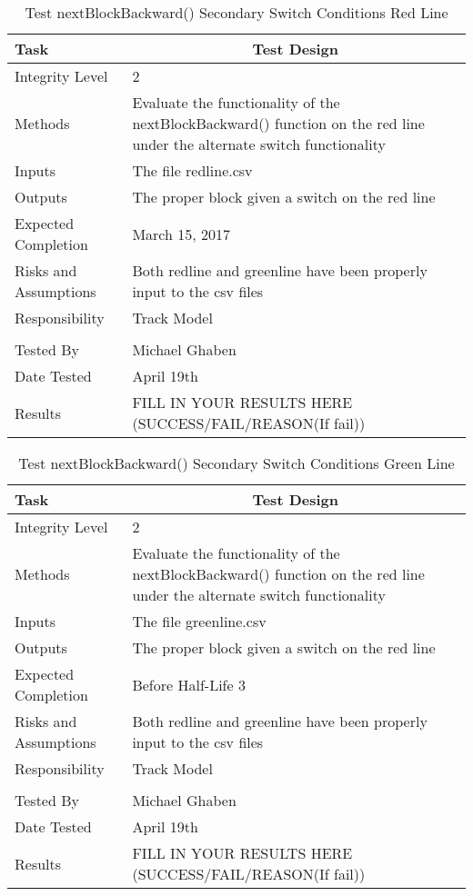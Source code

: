 \documentclass[]{article}
\begin{document}
\begin{table}[H]
	\centering
	\caption{Test nextBlockBackward() Secondary Switch Conditions Red Line}
	\begin{tabular}{|l|l|}
		\hline
		Task & \multicolumn{1}{c|}{Test Design} \\ \hline
		Integrity Level & 2 \\ \hline
		Methods & \parbox[t]{10cm}{Evaluate the functionality of the nextBlockBackward() function on the red line under the alternate switch functionality}\\ \hline
		Inputs &  The file redline.csv \\ \hline
		Outputs &  The proper block given a switch on the red line\\ \hline
		Expected Completion & March 15, 2017\\ \hline
		Risks and Assumptions & Both redline and greenline have been properly input to the csv files \\ \hline
		Responsibility & Track Model\\ \hline
		\\ \hline
		Tested By   &  Michael Ghaben\\	\hline
		Date Tested & \parbox[t]{10cm}{April 19th}\\ \hline
		Results & FILL IN YOUR RESULTS HERE (SUCCESS/FAIL/REASON(If fail))\\ \hline
	\end{tabular}
\end{table}

\begin{table}[H]
	\centering
	\caption{Test nextBlockBackward() Secondary Switch Conditions Green Line}
	\begin{tabular}{|l|l|}
		\hline
		Task & \multicolumn{1}{c|}{Test Design} \\ \hline
		Integrity Level & 2 \\ \hline
		Methods & \parbox[t]{10cm}{Evaluate the functionality of the nextBlockBackward() function on the red line under the alternate switch functionality} \\ \hline
		Inputs &  The file greenline.csv \\ \hline
		Outputs &  The proper block given a switch on the red line\\ \hline
		Expected Completion & Before Half-Life 3\\ \hline
		Risks and Assumptions & Both redline and greenline have been properly input to the csv files \\ \hline
		Responsibility & Track Model\\ \hline
		\\ \hline
		Tested By   &  Michael Ghaben\\	\hline
		Date Tested & \parbox[t]{10cm}{April 19th}\\ \hline
		Results & FILL IN YOUR RESULTS HERE (SUCCESS/FAIL/REASON(If fail))\\ \hline
	\end{tabular}
\end{table}
\end{document}
